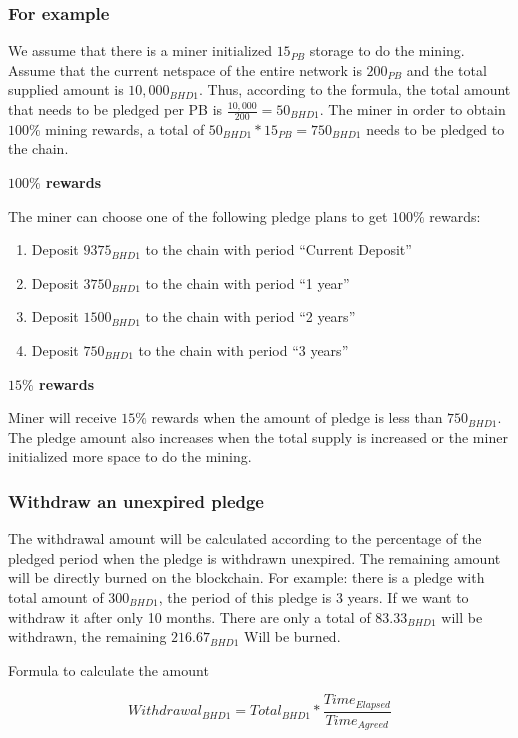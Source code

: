 \subsubsection{For example}
\begin{flushleft}
    We assume that there is a miner initialized $15_{PB}$ storage to do the mining. Assume that the current netspace of the entire network is $200_{PB}$ and the total supplied amount is $10,000_{BHD1}$. Thus, according to the formula, the total amount that needs to be pledged per PB is $\frac{10,000}{200}=50_{BHD1}$. The miner in order to obtain $100\%$ mining rewards, a total of $50_{BHD1} * 15_{PB} = 750_{BHD1}$ needs to be pledged to the chain.
\end{flushleft}
\textbf{$100\%$ rewards}
\begin{flushleft}
    The miner can choose one of the following pledge plans to get $100\%$ rewards:
    \begin{enumerate}
        \item Deposit $9375_{BHD1}$ to the chain with period ``Current Deposit''
        \item Deposit $3750_{BHD1}$ to the chain with period ``1 year''
        \item Deposit $1500_{BHD1}$ to the chain with period ``2 years''
        \item Deposit $750_{BHD1}$ to the chain with period ``3 years''
    \end{enumerate}
\end{flushleft}
\textbf{$15\%$ rewards}
\begin{flushleft}
    Miner will receive $15\%$ rewards when the amount of pledge is less than $750_{BHD1}$. The pledge amount also increases when the total supply is increased or the miner initialized more space to do the mining.
\end{flushleft}
\subsubsection{Withdraw an unexpired pledge}
\begin{flushleft}
    The withdrawal amount will be calculated according to the percentage of the pledged period when the pledge is withdrawn unexpired. The remaining amount will be directly burned on the blockchain. For example: there is a  pledge with total amount of $300_{BHD1}$, the period of this pledge is 3 years. If we want to withdraw it after only 10 months. There are only a total of $83.33_{BHD1}$ will be withdrawn, the remaining $216.67_{BHD1}$ Will be burned.
\end{flushleft}
\begin{flushleft}
    Formula to calculate the amount
\end{flushleft}
\begin{equation}
    Withdrawal_{BHD1} = Total_{BHD1} * \frac{Time_{Elapsed}}{Time_{Agreed}}
\end{equation}

